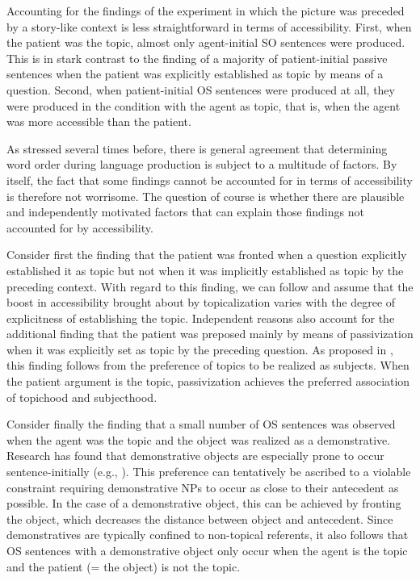 \documentclass[output=paper,colorlinks,citecolor=brown]{langscibook}
\begin{document}
Accounting for the findings of the experiment in which the picture was preceded by a story-like context is less straightforward in terms of accessibility. First, when the patient was the topic, almost only agent-initial SO sentences were produced. This is in stark contrast to the finding of a majority of patient-initial passive sentences when the patient was explicitly established as topic by means of a question. Second, when patient-initial OS sentences were produced at all, they were produced in the condition with the agent as topic, that is, when the agent was more accessible than the patient.

As stressed several times before, there is general agreement that determining word order during language production is subject to a multitude of factors. By itself, the fact that some findings cannot be accounted for in terms of accessibility is therefore not worrisome. The question of course is whether there are plausible and independently motivated factors that can explain those findings not accounted for by accessibility.

Consider first the finding that the patient was fronted when a question explicitly established it as topic but not when it was implicitly established as topic by the preceding context. With regard to this finding, we can follow \citet{Rohde::Kehler-14} and assume that the boost in accessibility brought about by topicalization varies with the degree of explicitness of establishing the topic. Independent reasons also account for the additional finding that the patient was preposed mainly by means of passivization when it was explicitly set as topic by the preceding question. As proposed in \citet{Bader-20-Objects-in-the}, this finding follows from the preference of topics to be realized as subjects. When the patient argument is the topic, passivization achieves the preferred association of topichood and subjecthood.

Consider finally the finding that a small number of OS sentences was observed when the agent was the topic and the object was realized as a demonstrative. Research has found that demonstrative objects are especially prone to occur sentence-initially (e.g., \citealt{Bader::Portele-21}). This preference can tentatively be ascribed to a violable constraint requiring demonstrative NPs to occur as close to their antecedent as possible. In the case of a demonstrative object, this can be achieved by fronting the object, which decreases the distance between object and antecedent. Since demonstratives are typically confined to non-topical referents, it also follows that OS sentences with a demonstrative object only occur when the agent is the topic and the patient (= the object) is not the topic.
\end{document}
